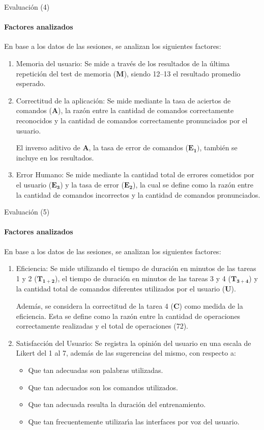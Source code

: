 \begin{frame}{Evaluaci\'on (4)}
\framesubtitle{Factores analizados}
En base a los datos de las sesiones, se analizan los siguientes factores:

\begin{enumerate}
    \item Memoria del usuario:
    Se mide a trav\'es de los resultados de la \'ultima repetici\'on del test de memoria 
    ($\boldsymbol{M}$), siendo 12--13 el resultado promedio esperado.
    \item Correctitud de la aplicaci\'on:
    Se mide mediante la tasa de aciertos de comandos ($\boldsymbol{A}$),
    la raz\'on entre la cantidad de comandos correctamente reconocidos  y la cantidad de comandos correctamente pronunciados por el usuario.
    
    El inverso aditivo de $\boldsymbol{A}$, la tasa de error de comandos ($\boldsymbol{E_1})$, tambi\'en se
    incluye en los resultados.

    \item Error Humano:
    Se mide mediante la cantidad total de errores cometidos por el usuario ($\boldsymbol{E_3}$) y la tasa
    de error ($\boldsymbol{E_2}$), la cual se define como la raz\'on entre la cantidad de comandos incorrectos
    y la cantidad de comandos pronunciados.
\end{enumerate}
\end{frame}

\begin{frame}{Evaluaci\'on (5)}
\framesubtitle{Factores analizados}
En base a los datos de las sesiones, se analizan los siguientes factores:

\begin{enumerate}
    \item Eficiencia:
    Se mide utilizando el tiempo de duraci\'on en minutos de las tareas 1 y 2 ($\boldsymbol{T_{1+2}}$),
    el tiempo de duraci\'on en minutos de las tareas 3 y 4 ($\boldsymbol{T_{3+4}}$) y la cantidad total 
    de comandos diferentes utilizados por el usuario ($\boldsymbol{U}$).

    Adem\'as, se considera la correctitud de la tarea 4 ($\boldsymbol{C}$) como medida de la eficiencia. 
    Esta se define como la raz\'on entre la cantidad de operaciones correctamente realizadas y el total 
    de operaciones (72).

    \item Satisfacci\'on del Usuario: 
    Se registra la opini\'on del usuario en una escala de Likert \cite{Allen:2007} del 1 al 7,
    adem\'as de las sugerencias del mismo, con respecto a:
    \begin{itemize}
        \item Que tan adecuadas son palabras utilizadas.
        \item Que tan adecuados son los comandos utilizados.
        \item Que tan adecuada resulta la duraci\'on del entrenamiento.
        \item Que tan frecuentemente utilizar{\'\i}a las interfaces por voz del usuario.
    \end{itemize}
\end{enumerate}
\end{frame}


